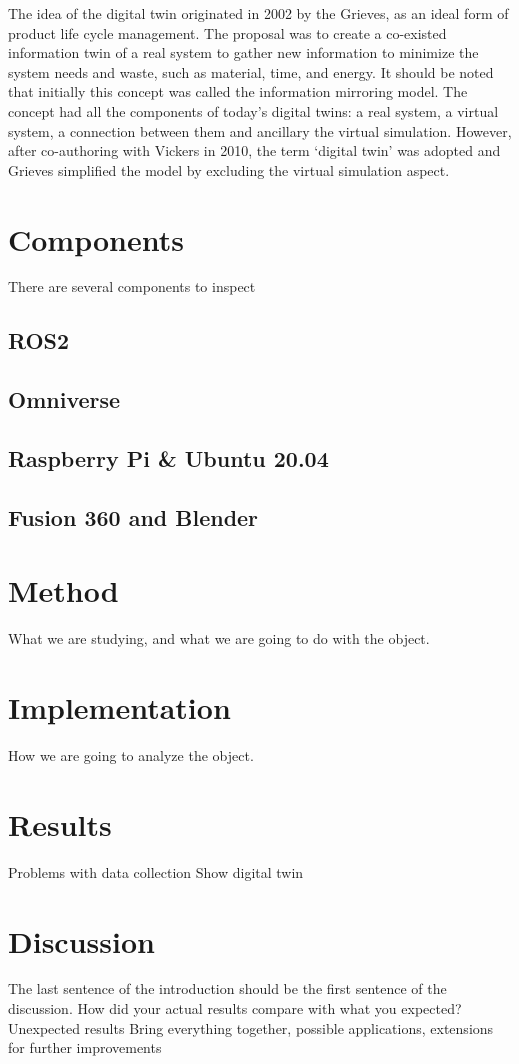 \documentclass[conference]{IEEEtran}
\begin{document}
    The idea of the digital twin originated in 2002 by the Grieves, as an ideal form of product life cycle management. 
    The proposal was to create a co-existed information twin of a real system to gather new information to minimize 
    the system needs and waste, such as material, time, and energy. It should be noted that initially this concept was 
    called the information mirroring model. The concept had all the components of today's digital twins: a real system, 
    a virtual system,  a connection between them and ancillary the virtual simulation. However, after co-authoring with Vickers in 2010, 
    the term `digital twin' was adopted and Grieves simplified the model by excluding the virtual simulation aspect.


    \section{Components}\label{section:components}
    There are several components to inspect

    \subsection{ROS2}\label{section:ros2}
    \subsection{Omniverse}\label{section:Omniverse}
    \subsection{Raspberry Pi \& Ubuntu 20.04}\label{section:RaspberryPi}
    \subsection{Fusion 360 and Blender}\label{section:Fusion360}
    \section{Method}\label{section:method}
    What we are studying, and what we are going to do with the object.
    \section{Implementation}\label{section:implementation}
    How we are going to analyze the object.
    \section{Results}\label{section:results}
    Problems with data collection
    Show digital twin
    \section{Discussion}\label{section:discussion}
    The last sentence of the introduction should be the first sentence of the discussion.
    How did your actual results compare with what you expected?
    Unexpected results
    Bring everything together, possible applications, extensions for further improvements
    
    
    
\end{document}
